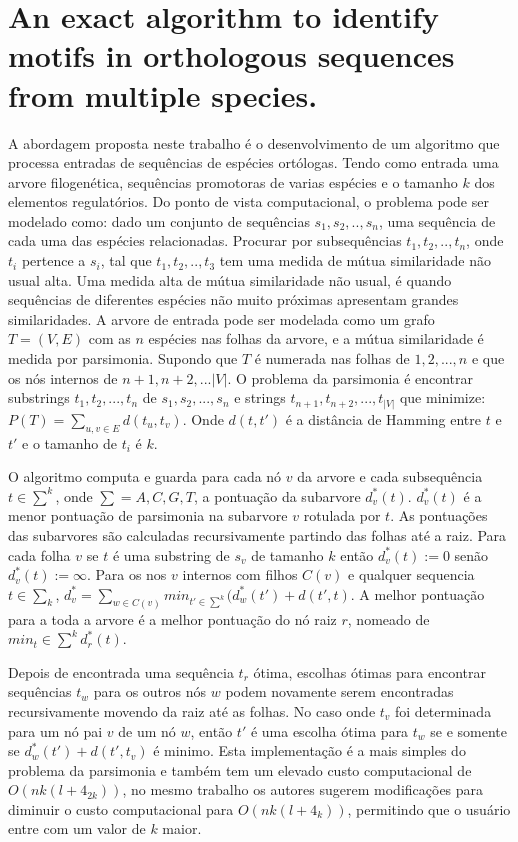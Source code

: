 \section{An exact algorithm to identify motifs in orthologous sequences from multiple species.}

A abordagem proposta neste trabalho é o desenvolvimento de um algoritmo que processa entradas de sequências de espécies ortólogas. Tendo como entrada uma arvore filogenética, sequências promotoras de varias espécies e o tamanho $k$ dos elementos regulatórios. Do ponto de vista computacional, o problema pode ser modelado como: dado um conjunto de sequências $s_{1},s_{2},..,s_{n}$, uma sequência de cada uma das espécies relacionadas. Procurar por subsequências $t_{1},t_{2},..,t_{n}$, onde $t_{i}$ pertence a $s_{i}$, tal que $t_{1},t_{2},..,t_{3}$ tem uma medida de mútua similaridade não usual alta. Uma medida alta de mútua similaridade não usual, é quando sequências de diferentes espécies não muito próximas apresentam grandes similaridades.
A arvore de entrada pode ser modelada como um grafo $T = (V,E)$ com as $n$ espécies nas folhas da arvore, e a mútua similaridade é medida por parsimonia. Supondo que $T$ é numerada nas folhas de $1,2,...,n$ e que os nós internos de $n+1,n+2,...|V|$. O problema da parsimonia é encontrar substrings $t_{1},t_{2},...,t_{n}$ de $s_{1},s_{2},...,s_{n}$ e strings $t_{n+1},t_{n+2},...,t_{|V|}$ que minimize: $ P(T) = \sum_{u,v \in E} d(t_{u},t_{v})$. Onde $d(t,t')$ é a distância de Hamming entre $t$ e $t'$ e o tamanho de $t_{i}$ é $k$.

O algoritmo computa e guarda para cada nó $v$ da arvore e cada subsequência $t \in \sum^{k}$, onde $\sum = {A,C,G,T}$, a pontuação da subarvore $d_{v}^*(t)$. $d_{v}^*(t)$ é a menor pontuação de parsimonia na subarvore $v$ rotulada por $t$. As pontuações das subarvores são calculadas recursivamente partindo das folhas até a raiz. Para cada folha $v$ se $t$ é uma substring de $s_{v}$ de tamanho $k$ então $d_{v}^*(t) := 0$ senão $d_{v}^*(t) := \infty$. Para os nos $v$ internos com filhos $C(v)$ e qualquer sequencia $t \in \sum_{k}$, $d_{v}^* = \sum_{w \in C(v)} min_{t' \in \sum^{k}}(d_{w}^*(t')+d(t',t)$. A melhor pontuação para a toda a arvore é a melhor pontuação do nó raiz $r$, nomeado de $min_{t} \in \sum^{k} d_{r}^*(t)$.

Depois de encontrada uma sequência $t_{r}$ ótima, escolhas ótimas para encontrar sequências $t_{w}$ para os outros nós $w$ podem novamente serem encontradas recursivamente movendo da raiz até as folhas. No caso onde $t_{v}$ foi determinada para um nó pai $v$ de um nó $w$, então $t'$ é uma escolha ótima para $t_{w}$ se e somente se $d_{w}^*(t')+d(t',t_{v})$ é minimo. Esta implementação é a mais simples do problema da parsimonia e também tem um elevado custo computacional de $O(nk(l +4_{2k}))$, no mesmo trabalho os autores sugerem modificações para diminuir o custo computacional para $O(nk(l +4_{k}))$, permitindo que o usuário entre com um valor de $k$ maior.


